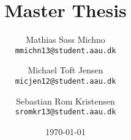 \newcommand{\TITLE}{Master Thesis}
\newcommand{\SUBTITLE}{}
\newcommand{\GROUP}{deis1014f18}
\newcommand{\PERIOD}{Spring semester, 2018}
\newcommand{\MEMBERS}{%
    Mathias Sass Michno\\
    Michael Toft Jensen\\
    Sebastian Rom Kristensen
}
\newcommand{\SUPERVISOR}{Stefan Schmid\\René Rydhof Hansen}
\newcommand{\COMPLETION}{XX June, 2018}

\title{\TITLE}
\subtitle{\SUBTITLE}
\author{
    Mathias Sass Michno\\
    \texttt{mmichn13@student.aau.dk}
    \and
    Michael Toft Jensen\\
    \texttt{micjen12@student.aau.dk}
    \and
    Sebastian Rom Kristensen\\
    \texttt{sromkr13@student.aau.dk}
}
\date{\today}
